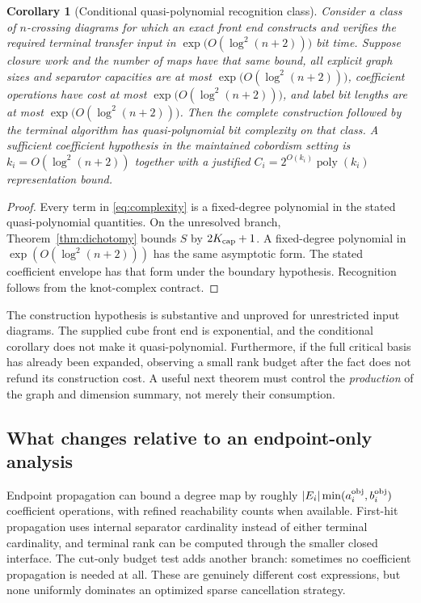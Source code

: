 \documentclass[11pt,letterpaper]{article}
\newtheorem{corollary}[theorem]{Corollary}
\theoremstyle{definition}\newtheorem{definition}[theorem]{Definition}
\theoremstyle{remark}\newtheorem{remark}[theorem]{Remark}
\newcommand{\poly}{\operatorname{poly}}
\newcommand{\qpoly}{\exp\!\bigl(O(\log^2(n+2))\bigr)}
\begin{document}
\begin{corollary}[Conditional quasi-polynomial recognition class]
\label{cor:qpoly}
Consider a class of $n$-crossing diagrams for which an exact front end
constructs and verifies the required terminal transfer input in
$\qpoly$ bit time. Suppose closure work and the number of maps have that
same bound, all explicit graph sizes and separator capacities are at most
$\qpoly$, coefficient operations have cost at most $\qpoly$, and label bit
lengths are at most $\qpoly$. Then the complete construction followed by the
terminal algorithm has quasi-polynomial bit complexity on that class.
A sufficient coefficient hypothesis in the maintained cobordism setting is
$k_i=O(\log^2(n+2))$ together with a justified
$C_i=2^{O(k_i)}\poly(k_i)$ representation bound.
\end{corollary}
\begin{proof}
Every term in \eqref{eq:complexity} is a fixed-degree polynomial in the
stated quasi-polynomial quantities. On the unresolved branch,
Theorem~\ref{thm:dichotomy} bounds $S$ by $2K_{\rm cap}+1$.
A fixed-degree polynomial in $\exp(O(\log^2(n+2)))$ has the same asymptotic
form. The stated coefficient envelope has that form under the boundary
hypothesis. Recognition follows from the knot-complex contract.
\end{proof}

The construction hypothesis is substantive and unproved for unrestricted
input diagrams. The supplied cube front end is exponential, and the
conditional corollary does not make it quasi-polynomial. Furthermore,
if the full critical basis has already been expanded, observing a small
rank budget after the fact does not refund its construction cost. A useful
next theorem must control the \emph{production} of the graph and dimension
summary, not merely their consumption.

\subsection{What changes relative to an endpoint-only analysis}
Endpoint propagation can bound a degree map by roughly
$|E_i|\min(a_i^{\rm obj},b_i^{\rm obj})$ coefficient operations, with refined
reachability counts when available. First-hit propagation uses internal
separator cardinality instead of either terminal cardinality, and terminal
rank can be computed through the smaller closed interface. The cut-only
budget test adds another branch: sometimes no coefficient propagation is
needed at all. These are genuinely different cost expressions, but none
uniformly dominates an optimized sparse cancellation strategy.
\end{document}
